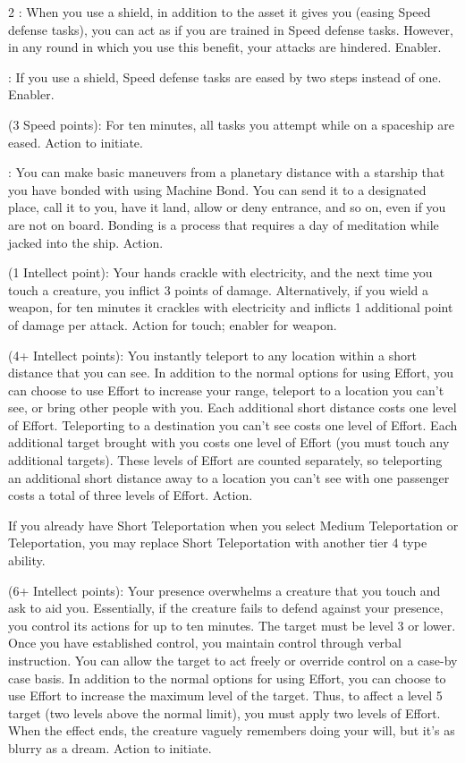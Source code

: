 \begin{multicols}{2}
: When you use a shield, in addition to the asset it gives you (easing Speed defense tasks), you can act as if you are trained in Speed defense tasks. However, in any round in which you use this benefit, your attacks are hindered. Enabler. 
 
: If you use a shield, Speed defense tasks are eased by two steps instead of one. Enabler. 
 
 (3 Speed points): For ten minutes, all tasks you attempt while on a spaceship are eased. Action to initiate. 
 
: You can make basic maneuvers from a planetary distance with a starship that you have bonded with using Machine Bond. You can send it to a designated place, call it to you, have it land, allow or deny entrance, and so on, even if you are not on board. Bonding is a process that requires a day of meditation while jacked into the ship. Action. 
 
 (1 Intellect point): Your hands crackle with electricity, and the next time you touch a creature, you inflict 3 points of damage. Alternatively, if you wield a weapon, for ten minutes it crackles with electricity and inflicts 1 additional point of damage per attack. Action for touch; enabler for weapon. 
 
 (4+ Intellect points): You instantly teleport to any location within a short distance that you can see. In addition to the normal options for using Effort, you can choose to use Effort to increase your range, teleport to a location you can’t see, or bring other people with you. Each additional short distance costs one level of Effort. Teleporting to a destination you can’t see costs one level of Effort. Each additional target brought with you costs one level of Effort (you must touch any additional targets). These levels of Effort are counted separately, so teleporting an additional short distance away to a location you can’t see with one passenger costs a total of three levels of Effort. Action.

If you already have Short Teleportation when you select Medium Teleportation or Teleportation, you may replace Short Teleportation with another tier 4 type ability.

 (6+ Intellect points): Your presence overwhelms a creature that you touch and ask to aid you. Essentially, if the creature fails to defend against your presence, you control its actions for up to ten minutes. The target must be level 3 or lower. Once you have established control, you maintain control through verbal instruction. You can allow the target to act freely or override control on a case-by case basis. In addition to the normal options for using Effort, you can choose to use Effort to increase the maximum level of the target. Thus, to affect a level 5 target (two levels above the normal limit), you must apply two levels of Effort. When the effect ends, the creature vaguely remembers doing your will, but it’s as blurry as a dream. Action to initiate. 
 

\end{multicols}
